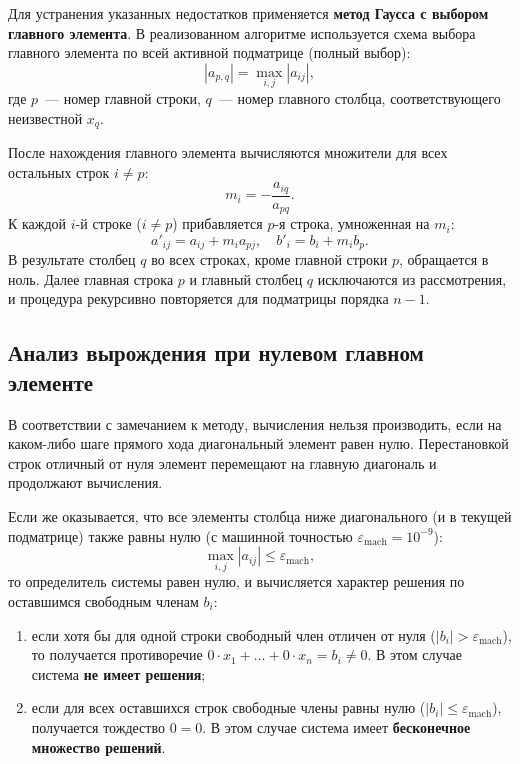 Для устранения указанных недостатков применяется \textbf{метод Гаусса с выбором главного элемента}. В реализованном алгоритме используется схема выбора главного элемента по всей активной подматрице (полный выбор):
\begin{equation}
    |a_{p, q}| = \max_{i, j} |a_{ij}|,
    \label{eq:pivot}
\end{equation}
где $p$~--- номер главной строки, $q$~--- номер главного столбца, соответствующего неизвестной $x_q$.

После нахождения главного элемента вычисляются множители для всех остальных строк $i \neq p$:
\begin{equation}
    m_i = -\frac{a_{iq}}{a_{pq}}.
\end{equation}
К каждой $i$-й строке ($i \neq p$) прибавляется $p$-я строка, умноженная на $m_i$:
\begin{equation}
    a'_{ij} = a_{ij} + m_i a_{pj}, \quad b'_i = b_i + m_i b_p.
\end{equation}
В результате столбец $q$ во всех строках, кроме главной строки $p$, обращается в ноль. Далее главная строка $p$ и главный столбец $q$ исключаются из рассмотрения, и процедура рекурсивно повторяется для подматрицы порядка $n-1$.

\subsection{Анализ вырождения при нулевом главном элементе}

В соответствии с замечанием к методу, вычисления нельзя производить, если на каком-либо шаге прямого хода диагональный элемент равен нулю. Перестановкой строк отличный от нуля элемент перемещают на главную диагональ и продолжают вычисления. 

Если же оказывается, что все элементы столбца ниже диагонального (и в текущей подматрице) также равны нулю (с машинной точностью $\varepsilon_{\text{mach}} = 10^{-9}$):
\begin{equation}
    \max_{i, j} |a_{ij}| \le \varepsilon_{\text{mach}},
\end{equation}
то определитель системы равен нулю, и вычисляется характер решения по оставшимся свободным членам $b_i$:
\begin{enumerate}
    \item если хотя бы для одной строки свободный член отличен от нуля ($|b_i| > \varepsilon_{\text{mach}}$), то получается противоречие $0 \cdot x_1 + \ldots + 0 \cdot x_n = b_i \neq 0$. В этом случае система \textbf{не имеет решения};
    \item если для всех оставшихся строк свободные члены равны нулю ($|b_i| \le \varepsilon_{\text{mach}}$), получается тождество $0 = 0$. В этом случае система имеет \textbf{бесконечное множество решений}.
\end{enumerate}

